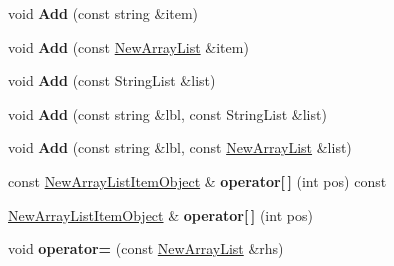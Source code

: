\begin{DoxyCompactItemize}
\item 
\hypertarget{classrr_1_1_new_array_list_a1721cdb3a0640296390668c1103340b1}{void {\bfseries Add} (const string \&item)}\label{classrr_1_1_new_array_list_a1721cdb3a0640296390668c1103340b1}

\item 
\hypertarget{classrr_1_1_new_array_list_af212d4b179761b78bfc5a6b24a10fd4c}{void {\bfseries Add} (const \hyperlink{classrr_1_1_new_array_list}{New\-Array\-List} \&item)}\label{classrr_1_1_new_array_list_af212d4b179761b78bfc5a6b24a10fd4c}

\item 
\hypertarget{classrr_1_1_new_array_list_a96c3aa0ba32a283bca4ba59906a7f301}{void {\bfseries Add} (const String\-List \&list)}\label{classrr_1_1_new_array_list_a96c3aa0ba32a283bca4ba59906a7f301}

\item 
\hypertarget{classrr_1_1_new_array_list_a71499faa31066e334796fc187f743a49}{void {\bfseries Add} (const string \&lbl, const String\-List \&list)}\label{classrr_1_1_new_array_list_a71499faa31066e334796fc187f743a49}

\item 
\hypertarget{classrr_1_1_new_array_list_aead7e451e506c3413a45b2ff44c8923d}{void {\bfseries Add} (const string \&lbl, const \hyperlink{classrr_1_1_new_array_list}{New\-Array\-List} \&list)}\label{classrr_1_1_new_array_list_aead7e451e506c3413a45b2ff44c8923d}

\item 
\hypertarget{classrr_1_1_new_array_list_af07a7247674b967cef5e7b506d3ff60e}{const \hyperlink{classrr_1_1_new_array_list_item_object}{New\-Array\-List\-Item\-Object} \& {\bfseries operator\mbox{[}$\,$\mbox{]}} (int pos) const }\label{classrr_1_1_new_array_list_af07a7247674b967cef5e7b506d3ff60e}

\item 
\hypertarget{classrr_1_1_new_array_list_aaeb9e15e982f6ae7bd3d24e5db803492}{\hyperlink{classrr_1_1_new_array_list_item_object}{New\-Array\-List\-Item\-Object} \& {\bfseries operator\mbox{[}$\,$\mbox{]}} (int pos)}\label{classrr_1_1_new_array_list_aaeb9e15e982f6ae7bd3d24e5db803492}

\item 
\hypertarget{classrr_1_1_new_array_list_a002efd17b87881ffe7bf39442db463e0}{void {\bfseries operator=} (const \hyperlink{classrr_1_1_new_array_list}{New\-Array\-List} \&rhs)}\label{classrr_1_1_new_array_list_a002efd17b87881ffe7bf39442db463e0}


\end{DoxyCompactItemize}
